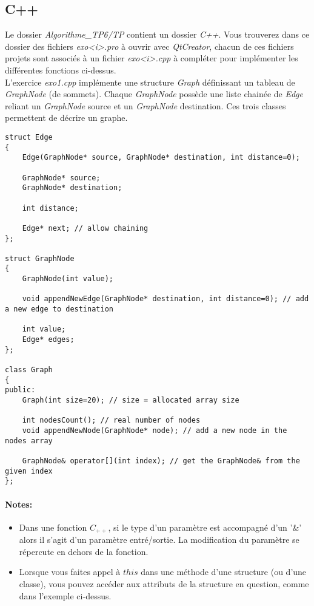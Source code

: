 \documentclass[11pt]{extarticle}
\begin{document}
\subsection{C++}
Le dossier \textit{Algorithme\_TP6/TP} contient un dossier \textit{C++}. Vous trouverez dans ce dossier des fichiers \textit{exo<i>.pro} à ouvrir avec \textit{QtCreator}, chacun de ces fichiers projets sont associés à un fichier \textit{exo<i>.cpp} à compléter pour implémenter les différentes fonctions ci-dessus. \\
L'exercice \textit{exo1.cpp} implémente une structure \textit{Graph} définissant un tableau de \textit{GraphNode} (de sommets). Chaque \textit{GraphNode} possède une liste chainée de \textit{Edge} reliant un \textit{GraphNode} source et un \textit{GraphNode} destination. Ces trois classes permettent de décrire un graphe.
\begin{lstlisting}[style=customc, escapechar=@]
struct Edge
{
	Edge(GraphNode* source, GraphNode* destination, int distance=0);

	GraphNode* source;
	GraphNode* destination;

	int distance;

	Edge* next; // allow chaining
};

struct GraphNode
{
	GraphNode(int value);

	void appendNewEdge(GraphNode* destination, int distance=0); // add a new edge to destination

	int value;
	Edge* edges;
};

class Graph
{
public:
	Graph(int size=20); // size = allocated array size

	int nodesCount(); // real number of nodes
	void appendNewNode(GraphNode* node); // add a new node in the nodes array

	GraphNode& operator[](int index); // get the GraphNode& from the given index
};
\end{lstlisting}
\paragraph{Notes:} 
\begin{itemize}
\item Dans une fonction $C_{++}$, si le type d'un paramètre est accompagné d'un '\&' alors il s'agit d'un paramètre entré/sortie. La modification du paramètre se répercute en dehors de la fonction.
\item Lorsque vous faites appel à $this$ dans une méthode d'une structure (ou d'une classe), vous pouvez accéder aux attributs de la structure en question, comme dans l'exemple ci-dessus.
\end{itemize}
\end{document}
